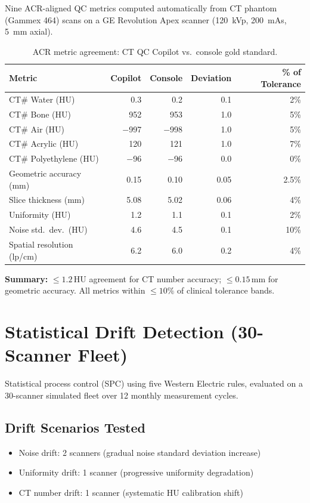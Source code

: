 \documentclass[11pt]{article}
\begin{document}
Nine ACR-aligned QC metrics computed automatically from CT phantom (Gammex 464) scans on a GE Revolution Apex scanner (120~kVp, 200~mAs, 5~mm axial).

\begin{table}[htbp]
\centering
\caption{ACR metric agreement: CT QC Copilot vs.\ console gold standard.}
\begin{tabular}{lrrrr}
\toprule
\textbf{Metric} & \textbf{Copilot} & \textbf{Console} &
  \textbf{Deviation} & \textbf{\% of Tolerance} \\
\midrule
CT\# Water (HU)          & 0.3     & 0.2     & 0.1   & 2\% \\
CT\# Bone (HU)           & 952     & 953     & 1.0   & 5\% \\
CT\# Air (HU)            & $-$997  & $-$998  & 1.0   & 5\% \\
CT\# Acrylic (HU)        & 120     & 121     & 1.0   & 7\% \\
CT\# Polyethylene (HU)   & $-$96   & $-$96   & 0.0   & 0\% \\
Geometric accuracy (mm)  & 0.15    & 0.10    & 0.05  & 2.5\% \\
Slice thickness (mm)     & 5.08    & 5.02    & 0.06  & 4\% \\
Uniformity (HU)          & 1.2     & 1.1     & 0.1   & 2\% \\
Noise std.\ dev.\ (HU)  & 4.6     & 4.5     & 0.1   & 10\% \\
Spatial resolution (lp/cm) & 6.2   & 6.0     & 0.2   & 4\% \\
\bottomrule
\end{tabular}
\end{table}

\noindent\textbf{Summary:} $\leq 1.2$\,HU agreement for CT number accuracy; $\leq 0.15$\,mm for geometric accuracy.  All metrics within $\leq 10\%$ of clinical tolerance bands.

\section{Statistical Drift Detection (30-Scanner Fleet)}

Statistical process control (SPC) using five Western Electric rules, evaluated on a 30-scanner simulated fleet over 12 monthly measurement cycles.

\subsection{Drift Scenarios Tested}
\begin{itemize}
  \item Noise drift: 2 scanners (gradual noise standard deviation increase)
  \item Uniformity drift: 1 scanner (progressive uniformity degradation)
  \item CT number drift: 1 scanner (systematic HU calibration shift)
\end{itemize}
\end{document}

